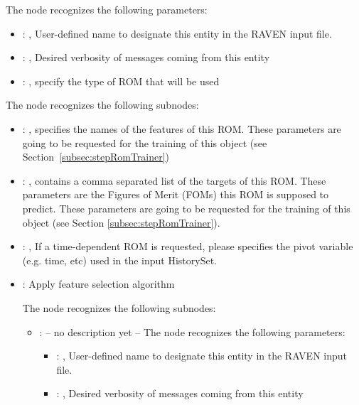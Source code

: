   The  node recognizes the following parameters:
    \begin{itemize}
      \item {}: , 
        User-defined name to designate this entity in the RAVEN input file.
      \item {}: , 
        Desired verbosity of messages coming from this entity
      \item {}: , 
        specify the type of ROM that will be used
  \end{itemize}

  The  node recognizes the following subnodes:
  \begin{itemize}
    \item {}: , 
      specifies the names of the features of this ROM.         \nb These parameters are going to be
      requested for the training of this object         (see Section~\ref{subsec:stepRomTrainer})

    \item {}: , 
      contains a comma separated list of the targets of this ROM. These parameters         are the
      Figures of Merit (FOMs) this ROM is supposed to predict.         \nb These parameters are
      going to be requested for the training of this         object (see Section
      \ref{subsec:stepRomTrainer}).

    \item {}: , 
      If a time-dependent ROM is requested, please specifies the pivot         variable (e.g. time,
      etc) used in the input HistorySet.

    \item {}:
      Apply feature selection algorithm

      The  node recognizes the following subnodes:
      \begin{itemize}
        \item {}:
          -- no description yet --
          The  node recognizes the following parameters:
            \begin{itemize}
              \item {}: , 
                User-defined name to designate this entity in the RAVEN input file.
              \item {}: , 
                Desired verbosity of messages coming from this entity
          \end{itemize}


\end{itemize}
\end{itemize}
